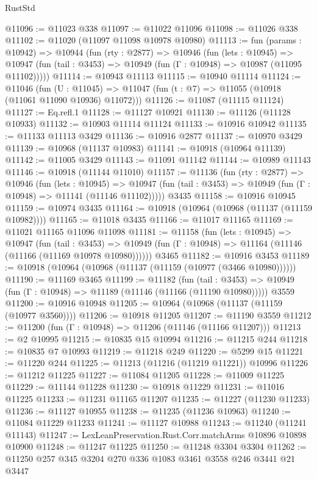 \begin{lexlean}{RustStd}
\begin{coremodule}
{{{{{{{{{{{{{{{{{{{@11096 := @11023 @338
@11097 := @11022 @11096
@11098 := @11026 @338
@11102 := @11020 (@11097 @11098 @10978 @10980)
@11113 := fun (params : @10942) =>
  @10944
    (fun (rty : @2877) =>
    @10946
      (fun (lets : @10945) =>
      @10947 (fun (tail : @3453) => @10949 (fun (Γ : @10948) => @10987 (@11095 @11102)))))
@11114 := @10943 @11113
@11115 := @10940 @11114
@11124 := @11046
    (fun (U : @11045) => @11047 (fun (t : @7) => @11055 (@10918 (@11061 @11090 @10936) @11072)))
@11126 := @11087 (@11115 @11124)
@11127 := Eq.refl.{1}
@11128 := @11127 @10921
@11130 := @11126 (@11128 @10933)
@11132 := @10903 @11114 @11124
@11133 := @10916 @10942
@11135 := @11133 @11113 @3429
@11136 := @10916 @2877
@11137 := @10970 @3429
@11139 := @10968 (@11137 @10983)
@11141 := @10918 (@10964 @11139)
@11142 := @11005 @3429
@11143 := @11091 @11142
@11144 := @10989 @11143
@11146 := @10918 (@11144 @11010)
@11157 := @11136
    (fun (rty : @2877) =>
    @10946
      (fun (lets : @10945) =>
      @10947 (fun (tail : @3453) => @10949 (fun (Γ : @10948) => @11141 (@11146 @11102)))))
    @3435
@11158 := @10916 @10945
@11159 := @10974 @3435
@11164 := @10918 (@10964 (@10968 (@11137 (@11159 @10982))))
@11165 := @11018 @3435
@11166 := @11017 @11165
@11169 := @11021 @11165 @11096 @11098
@11181 := @11158
    (fun (lets : @10945) =>
    @10947
      (fun (tail : @3453) =>
      @10949 (fun (Γ : @10948) => @11164 (@11146 (@11166 (@11169 @10978 @10980))))))
    @3465
@11182 := @10916 @3453
@11189 := @10918 (@10964 (@10968 (@11137 (@11159 (@10977 (@3466 @10980))))))
@11190 := @11169 @3465
@11199 := @11182
    (fun (tail : @3453) => @10949 (fun (Γ : @10948) => @11189 (@11146 (@11166 (@11190 @10980)))))
    @3559
@11200 := @10916 @10948
@11205 := @10964 (@10968 (@11137 (@11159 (@10977 @3560))))
@11206 := @10918 @11205
@11207 := @11190 @3559
@11212 := @11200 (fun (Γ : @10948) => @11206 (@11146 (@11166 @11207)))
@11213 := @2 @10995
@11215 := @10835 @15 @10994
@11216 := @11215 @244
@11218 := @10835 @7 @10993
@11219 := @11218 @249
@11220 := @5299 @15
@11221 := @11220 @244
@11225 := @11213 (@11216 (@11219 @11221)) @10996
@11226 := @11212 @11225
@11227 := @11084 @11205
@11228 := @11009 @11225
@11229 := @11144 @11228
@11230 := @10918 @11229
@11231 := @11016 @11225
@11233 := @11231 @11165 @11207
@11235 := @11227 (@11230 @11233)
@11236 := @11127 @10955
@11238 := @11235 (@11236 @10963)
@11240 := @11084 @11229 @11233
@11241 := @11127 @10988
@11243 := @11240 (@11241 @11143)
@11247 := LexLeanPreservation.Rust.Corr.matchArms @10896 @10898 @10900
@11248 := @11247 @11225
@11250 := @11248 @3304 @3304
@11262 := @11250 @257 @345 @3204 @270 @336 @1083 @3461 @3558 @246 @3441 @21 @3447
}}}}}}}}}}}}}}}}}}}
\end{coremodule}
\end{lexlean}
